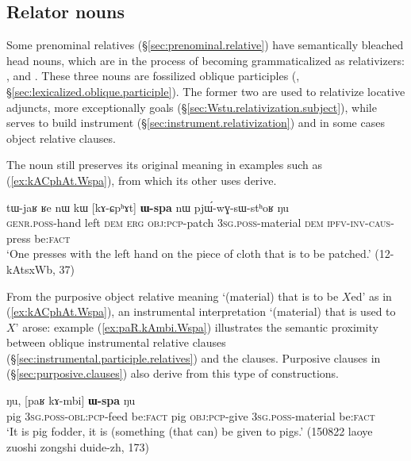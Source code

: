 \subsection{Relator nouns} \label{sec:Wspa.relative}  
Some prenominal relatives (§\ref{sec:prenominal.relative}) have semantically bleached head nouns, which are in the process of becoming grammaticalized as relativizers:  ,   and . These three nouns are fossilized oblique participles (, §\ref{sec:lexicalized.oblique.participle}). The former two are used to relativize locative adjuncts, more exceptionally goals (§\ref{sec:Wstu.relativization.subject}), while   serves to build  instrument (§\ref{sec:instrument.relativization}) and in some cases object relative clauses.
 
The noun  still preserves its original meaning in examples such as (\ref{ex:kACphAt.Wspa}), from which its other uses derive.
 
\begin{exe}
\ex \label{ex:kACphAt.Wspa} 
\gll tɯ-jaʁ ʁe nɯ kɯ [kɤ-ɕpʰɤt] \textbf{ɯ-spa} nɯ pjɯ́-wɣ-sɯ-stʰoʁ ŋu \\
\textsc{genr}.\textsc{poss}-hand left \textsc{dem} \textsc{erg} \textsc{obj}:\textsc{pcp}-patch \textsc{3sg}.\textsc{poss}-material \textsc{dem} \textsc{ipfv}-\textsc{inv}-\textsc{caus}-press be:\textsc{fact} \\
\glt `One presses with the left hand on the piece of cloth that is to be patched.' (12-kAtsxWb, 37)
\end{exe}

From the purposive object relative meaning `(material) that is to be $X$ed' as in (\ref{ex:kACphAt.Wspa}), an instrumental interpretation `(material) that is used to $X$' arose: example (\ref{ex:paR.kAmbi.Wspa}) illustrates the semantic proximity between oblique instrumental relative clauses (§\ref{sec:instrumental.participle.relatives}) and the  clauses. Purposive clauses in  (§\ref{sec:purposive.clauses}) also derive from this type of constructions.

\begin{exe}
\ex \label{ex:paR.kAmbi.Wspa} 
 ŋu, [paʁ kɤ-mbi] \textbf{ɯ-spa} ŋu \\
pig \textsc{3sg}.\textsc{poss}-\textsc{obl}:\textsc{pcp}-feed be:\textsc{fact} pig \textsc{obj}:\textsc{pcp}-give \textsc{3sg}.\textsc{poss}-material be:\textsc{fact} \\
\glt `It is pig fodder, it is (something (that can) be given to pigs.' (150822 laoye zuoshi zongshi duide-zh, 173)
\end{exe}  


